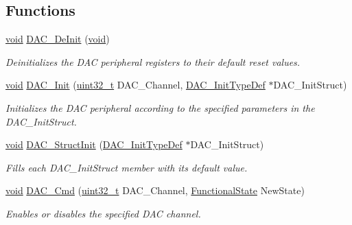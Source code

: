\subsection*{Functions}
\begin{DoxyCompactItemize}
\item 
\hyperlink{usb__devapi_8h_afabf60e7f57651d6d595a02c75f07cd0}{void} \hyperlink{group___d_a_c___exported___functions_ga1fae225204e1e049d6795319e99ba8bc}{D\+A\+C\+\_\+\+De\+Init} (\hyperlink{usb__devapi_8h_afabf60e7f57651d6d595a02c75f07cd0}{void})
\begin{DoxyCompactList}\small\item\em Deinitializes the D\+AC peripheral registers to their default reset values. \end{DoxyCompactList}\item 
\hyperlink{usb__devapi_8h_afabf60e7f57651d6d595a02c75f07cd0}{void} \hyperlink{group___d_a_c___exported___functions_ga7c59850468ed4bf0659663fe495441da}{D\+A\+C\+\_\+\+Init} (\hyperlink{_p_e___types_8h_a33594304e786b158f3fb30289278f5af}{uint32\+\_\+t} D\+A\+C\+\_\+\+Channel, \hyperlink{struct_d_a_c___init_type_def}{D\+A\+C\+\_\+\+Init\+Type\+Def} $\ast$D\+A\+C\+\_\+\+Init\+Struct)
\begin{DoxyCompactList}\small\item\em Initializes the D\+AC peripheral according to the specified parameters in the D\+A\+C\+\_\+\+Init\+Struct. \end{DoxyCompactList}\item 
\hyperlink{usb__devapi_8h_afabf60e7f57651d6d595a02c75f07cd0}{void} \hyperlink{group___d_a_c___exported___functions_gadfc270974d54cb5fa5f92556015c4046}{D\+A\+C\+\_\+\+Struct\+Init} (\hyperlink{struct_d_a_c___init_type_def}{D\+A\+C\+\_\+\+Init\+Type\+Def} $\ast$D\+A\+C\+\_\+\+Init\+Struct)
\begin{DoxyCompactList}\small\item\em Fills each D\+A\+C\+\_\+\+Init\+Struct member with its default value. \end{DoxyCompactList}\item 
\hyperlink{usb__devapi_8h_afabf60e7f57651d6d595a02c75f07cd0}{void} \hyperlink{group___d_a_c___exported___functions_ga323e61530d7fa9396c3bce9edb61f733}{D\+A\+C\+\_\+\+Cmd} (\hyperlink{_p_e___types_8h_a33594304e786b158f3fb30289278f5af}{uint32\+\_\+t} D\+A\+C\+\_\+\+Channel, \hyperlink{agilefox_2library_2inc_2stm32f10x__type_8h_ac9a7e9a35d2513ec15c3b537aaa4fba1}{Functional\+State} New\+State)
\begin{DoxyCompactList}\small\item\em Enables or disables the specified D\+AC channel. \end{DoxyCompactList}\item 

\end{DoxyCompactItemize}
